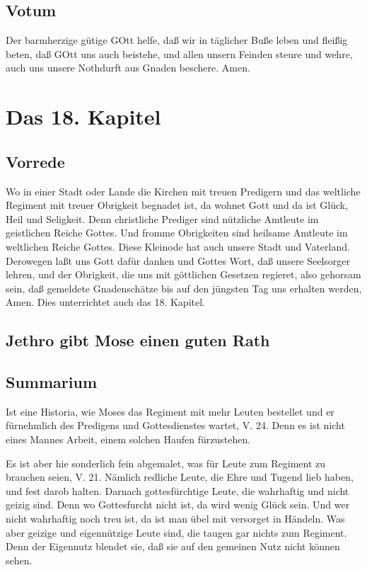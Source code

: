 \section{Votum}

Der barmherzige gütige GOtt helfe, daß wir in täglicher Buße leben und fleißig beten, daß GOtt uns auch beistehe, und allen unsern Feinden steure und wehre, auch uns unsere Nothdurft aus Gnaden beschere. Amen.

\chapter{Das 18. Kapitel}

\section{Vorrede}

Wo in einer Stadt oder Lande die Kirchen mit treuen Predigern und das weltliche Regiment mit treuer Obrigkeit begnadet ist, da wohnet Gott und da ist Glück, Heil und Seligkeit. Denn christliche Prediger sind nützliche Amtleute im geistlichen Reiche Gottes. Und fromme Obrigkeiten sind heilsame Amtleute im weltlichen Reiche Gottes. Diese Kleinode hat auch unsere Stadt und Vaterland. Derowegen laßt uns Gott dafür danken und Gottes Wort, daß unsere Seelsorger lehren, und der Obrigkeit, die uns mit göttlichen Gesetzen regieret, also gehorsam sein, daß gemeldete Gnadenschätze bis auf den jüngsten Tag uns erhalten werden, Amen. Dies unterrichtet auch das 18. Kapitel.

\section{Jethro gibt Mose einen guten Rath}

\section{Summarium}

Ist eine Historia, wie Moses das Regiment mit mehr Leuten bestellet und er fürnehmlich des Predigens und Gottesdienstes wartet, V. 24. Denn es ist nicht eines Mannes Arbeit, einem solchen Haufen fürzustehen.

Es ist aber hie sonderlich fein abgemalet, was für Leute zum Regiment zu brauchen seien, V. 21. Nämlich redliche Leute, die Ehre und Tugend lieb haben, und fest darob halten. Darnach gottesfürchtige Leute, die wahrhaftig und nicht geizig sind. Denn wo Gottesfurcht nicht ist, da wird wenig Glück sein. Und wer nicht wahrhaftig noch treu ist, da ist man übel mit versorget in Händeln. Was aber geizige und eigennützige Leute sind, die taugen gar nichts zum Regiment. Denn der Eigennutz blendet sie, daß sie auf den gemeinen Nutz nicht können sehen.

